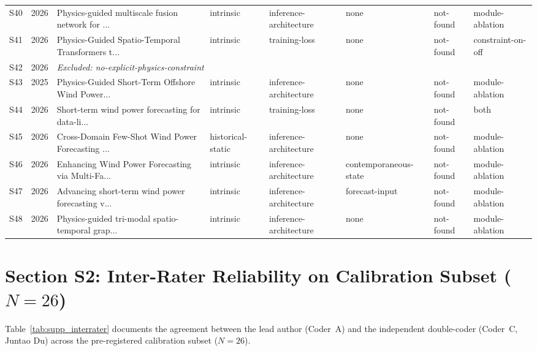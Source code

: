 \documentclass[3p,times]{elsarticle}
\begin{document}
\begin{longtable}{lp{0.7cm}p{3.8cm}p{1.6cm}p{2.0cm}p{1.5cm}p{1.4cm}p{1.6cm}}
S40 & 2026 & Physics-guided multiscale fusion network for ... & intrinsic & inference-architecture & none & not-found & module-ablation \\
S41 & 2026 & Physics-Guided Spatio-Temporal Transformers t... & intrinsic & training-loss & none & not-found & constraint-on-off \\
S42 & 2026 & \multicolumn{6}{l}{\textit{Excluded: no-explicit-physics-constraint}} \\
S43 & 2025 & Physics-Guided Short-Term Offshore Wind Power... & intrinsic & inference-architecture & none & not-found & module-ablation \\
S44 & 2026 & Short-term wind power forecasting for data-li... & intrinsic & training-loss & none & not-found & both \\
S45 & 2026 & Cross-Domain Few-Shot Wind Power Forecasting ... & historical-static & inference-architecture & none & not-found & module-ablation \\
S46 & 2026 & Enhancing Wind Power Forecasting via Multi-Fa... & intrinsic & inference-architecture & contemporaneous-state & not-found & module-ablation \\
S47 & 2026 & Advancing short-term wind power forecasting v... & intrinsic & inference-architecture & forecast-input & not-found & module-ablation \\
S48 & 2026 & Physics-guided tri-modal spatio-temporal grap... & intrinsic & inference-architecture & none & not-found & module-ablation \\
\end{longtable}
\endgroup

\newpage
\section*{Section S2: Inter-Rater Reliability on Calibration Subset ($N=26$)}

Table~\ref{tab:supp_interrater} documents the agreement between the lead author (Coder~A) and the independent double-coder (Coder~C, Juntao Du) across the pre-registered calibration subset ($N=26$).
\end{document}

